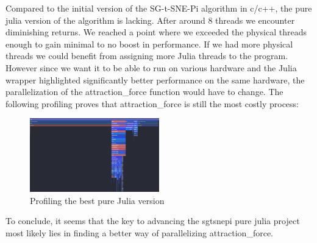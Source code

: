 Compared to the initial version of the SG-t-SNE-Pi algorithm in c/c++, the pure julia version of the algorithm 
is lacking. After around 8 threads we encounter diminishing returns. We reached a point where we exceeded 
the physical threads enough to gain minimal to no boost in performance. If we had more physical threads 
we could benefit from assigning more Julia threads to the program. However since we want it to be able to 
run on various hardware and the Julia wrapper highlighted significantly better performance on the same 
hardware, the parallelization of the attraction\_force function would have to change. The following profiling 
proves that attraction\_force is still the most costly process:
\begin{figure}[H]
    \includegraphics[width=0.5\textwidth]{media/bhembedProfiling.png}
    \caption{Profiling the best pure Julia version}
\end{figure}

To conclude, it seems that the key to advancing the sgtsnepi pure julia project most likely lies in 
finding a better way of parallelizing attraction\_force.
